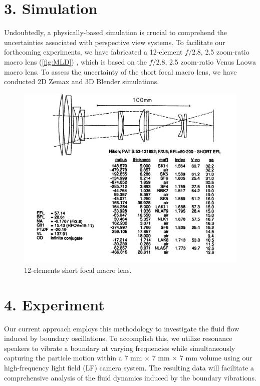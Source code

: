\documentclass[draftthesis,fullpage]{uiucthesis}
\begin{document}
\section*{3. Simulation}
Undoubtedly, a physically-based simulation is crucial to comprehend the uncertainties associated with perspective view systems. To facilitate our forthcoming experiments, we have fabricated a 12-element $f/2.8$, 2.5 zoom-ratio macro lens (\autoref{fig:MLD}) \citep{smith2005modern}, which is based on the $f/2.8$, 2.5 zoom-ratio Venus Laowa macro lens. To assess the uncertainty of the short focal macro lens, we have conducted 2D Zemax and 3D Blender simulations.

\begin{figure}[h]
  \centerline{\includegraphics[width=0.7\linewidth]{fig/modern_lens_design.png}} 
  \caption{12-elements short focal macro lens.}
\label{fig:MLD}
\end{figure}



\section*{4. Experiment}
Our current approach employs this methodology to investigate the fluid flow induced by boundary oscillations. To accomplish this, we utilize resonance speakers to vibrate a boundary at varying frequencies while simultaneously capturing the particle motion within a 7 mm $\times$ 7 mm $\times$ 7 mm volume using our high-frequency light field (LF) camera system. The resulting data will facilitate a comprehensive analysis of the fluid dynamics induced by the boundary vibrations.






%

\end{document}
